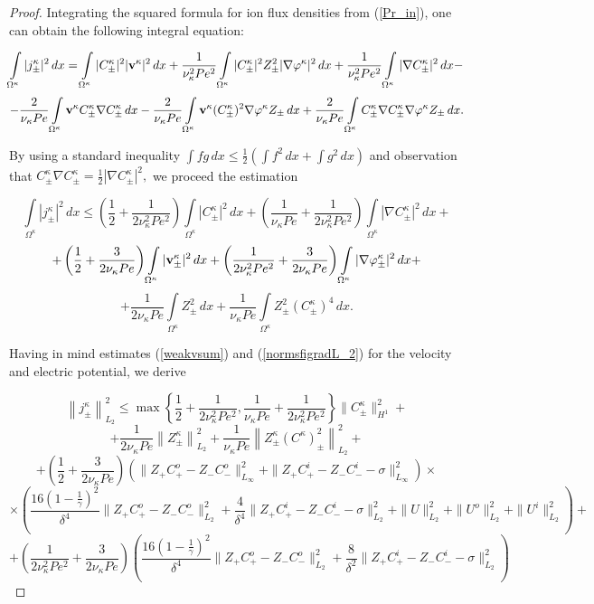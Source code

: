 \documentclass[10pt,a4paper]{amsart}
\begin{document}
\begin{proof}
Integrating the squared formula for ion flux densities from (\ref{Pr_in}), one can obtain the following integral equation:

$$\int\limits_{\Omega^{\kappa}}|j^{\kappa}_{\pm}|^2\,dx=\int\limits_{\Omega^{\kappa}}|C^{\kappa}_{\pm}|^2|{\bold v}^{\kappa}|^2\,dx+\frac{1}{\nu^2_{\kappa}Pe^2}\int\limits_{\Omega^{\kappa}}|C^{\kappa}_{\pm}|^2Z^2_{\pm}|\nabla\varphi^{\kappa}|^2\,dx+\frac{1}{\nu^2_{\kappa}Pe^2}\int\limits_{\Omega^{\kappa}}|\nabla C^{\kappa}_{\pm}|^2\,dx-$$
$$-\frac{2}{\nu_{\kappa}Pe}\int\limits_{\Omega^{\kappa}}{\bold v}^{\kappa}C^{\kappa}_{\pm}\nabla C^{\kappa}_{\pm}\,dx-\frac{2}{\nu_{\kappa}Pe}\int\limits_{\Omega^{\kappa}}{\bold v}^{\kappa}(C^{\kappa}_{\pm})^2\nabla {\varphi}^{\kappa}Z_{\pm}\,dx+\frac{2}{\nu_{\kappa}Pe}\int\limits_{\Omega^{\kappa}}C^{\kappa}_{\pm}\nabla C^{\kappa}_{\pm}\nabla {\varphi}^{\kappa}Z_{\pm}\,dx.$$

By using a standard inequality $\int fg\,dx\leq \frac{1}{2}\left(\int f^2\,dx+ \int g^2\,dx\right)$ and observation that $C^{\kappa}_{\pm}\nabla C^{\kappa}_{\pm}=\frac{1}{2}|\nabla C^{\kappa}_{\pm}|^2,$ we proceed the estimation

$$\int\limits_{\Omega^{\kappa}}|j^{\kappa}_{\pm}|^2\,dx\leq\left(\frac{1}{2}+\frac{1}{2\nu^2_{\kappa}Pe^2}\right)\int\limits_{\Omega^{\kappa}}|C^{\kappa}_{\pm}|^2\,dx+\left(\frac{1}{\nu_{\kappa}Pe}+\frac{1}{2\nu^2_{\kappa}Pe^2}\right)\int\limits_{\Omega^{\kappa}}|\nabla C^{\kappa}_{\pm}|^2\,dx+$$
$$+\left(\frac{1}{2}+\frac{3}{2\nu_{\kappa}Pe}\right)\int\limits_{\Omega^{\kappa}}| {\bold v}^{\kappa}_{\pm}|^2\,dx+\left(\frac{1}{2\nu^2_{\kappa}Pe^2}+\frac{3}{2\nu_{\kappa}Pe}\right)\int\limits_{\Omega^{\kappa}}| \nabla{\varphi}^{\kappa}_{\pm}|^2\,dx+$$
$$+\frac{1}{2\nu_{\kappa}Pe}\int\limits_{\Omega^{\kappa}}Z^2_{\pm}\,dx+\frac{1}{\nu_{\kappa}Pe}\int\limits_{\Omega^{\kappa}}Z^2_{\pm}(C^{\kappa}_{\pm})^4\,dx.$$


Having in mind estimates (\ref{weakvsum}) and (\ref{normsfigradL_2}) for the velocity and electric potential, we derive 


$$
\left\|j^{\kappa}_{\pm}\right\|^2_{L_2}\leq \max{\left\lbrace\frac{1}{2}+\frac{1}{2\nu_{\kappa}^2Pe^2},\frac{1}{\nu_{\kappa}Pe}+\frac{1}{2\nu_{\kappa}^2Pe^2}\right\rbrace}\|C^{\kappa}_{\pm}\|^2_{H^1}+$$
$$+\frac{1}{2\nu_{\kappa}Pe}\left\|Z^{\kappa}_{\pm}\right\|^2_{L_2}+\frac{1}{\nu_{\kappa}Pe}\left\|Z^{\kappa}_{\pm}(C^{\kappa})^2_{\pm}\right\|^2_{L_2}+ $$
$$+\left(\frac{1}{2}+\frac{3}{2\nu_{\kappa}Pe}\right)\left(\|Z_{+}C^{o}_{+}-Z_{-}C^{o}_{-}\|_{L_{\infty}}^2+\|Z_{+}C^{i}_{+}-Z_{-}C^{i}_{-}-\sigma\|_{L_{\infty}}^2\right)\times
$$
$$\times\left(\frac{16\left(1-\frac{1}{\gamma}\right)^2}{\delta^4}\|Z_{+}C^{o}_{+}-Z_{-}C^{o}_{-}\|_{L_2}^2+\frac{4}{\delta^4}\|Z_{+}C^{i}_{+}-Z_{-}C^{i}_{-}-\sigma\|_{L_2}^2+
\|U\|_{L_2}^2+\|U^o\|_{L_2}^2+\|U^i\|_{L_2}^2\right)+$$
$$+\left(\frac{1}{2\nu^2_{\kappa}Pe^2}+\frac{3}{2\nu_{\kappa}Pe}\right)\left(\frac{16\left(1-\frac{1}{\gamma}\right)^2}{\delta^4}\|Z_{+}C^{o}_{+}-Z_{-}C^{o}_{-}\|_{L_2}^2+\frac{8}{\delta^2}\|Z_{+}C^{i}_{+}-Z_{-}C^{i}_{-}-\sigma\|_{L_2}^2\right)$$





\end{proof}
\end{document}
